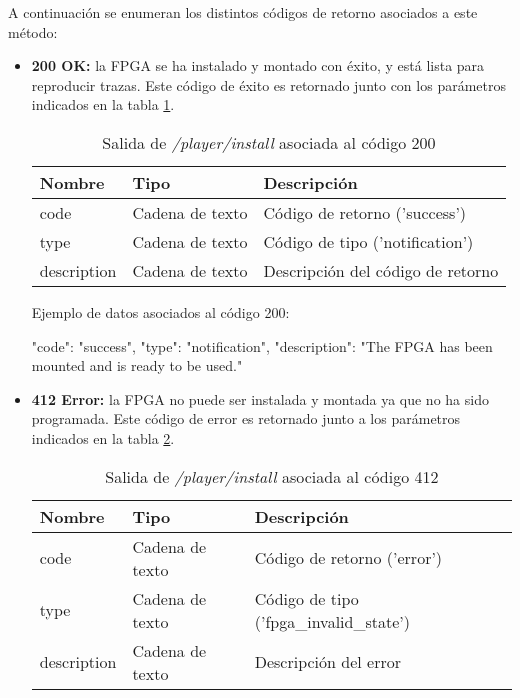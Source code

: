 A continuación se enumeran los distintos códigos de retorno asociados a este método:
\begin{itemize}

\item{\textbf{200 OK:} la \gls{FPGA} se ha instalado y montado con éxito, y está lista para reproducir \glspl{traza}. Este código de éxito es retornado junto con los parámetros indicados en la tabla \ref{extra:api:playerinstall:ok}.
\begin{table}[H]
\centering
\begin{tabular}{|l|l|l|}
\hline
\rowcolor[HTML]{F5F5F5}
\textbf{Nombre}  & \textbf{Tipo}   & \textbf{Descripción}              \\ \hline
code             & Cadena de texto & Código de retorno ('success')     \\ \hline
type             & Cadena de texto & Código de tipo ('notification')   \\ \hline
description      & Cadena de texto & Descripción del código de retorno \\ \hline
\end{tabular}
\caption{Salida de \textit{/player/install} asociada al código 200}
\label{extra:api:playerinstall:ok}
\end{table}
\begin{minipage}{\textwidth}
Ejemplo de datos asociados al código 200:

\begin{code}[language=json]
{
  "code": "success",
  "type": "notification",
  "description": "The FPGA has been mounted and is ready to be used."
}
\end{code}
\end{minipage}
}

\item{\textbf{412 Error:} la \gls{FPGA} no puede ser instalada y montada ya que no ha sido programada. Este código de error es retornado junto a los parámetros indicados en la tabla \ref{extra:api:playerinstall:error}.
\begin{table}[H]
\centering
\begin{tabular}{|l|l|l|}
\hline
\rowcolor[HTML]{F5F5F5}
\textbf{Nombre}  & \textbf{Tipo}   & \textbf{Descripción}                    \\ \hline
code             & Cadena de texto & Código de retorno ('error')             \\ \hline
type             & Cadena de texto & Código de tipo ('fpga\_invalid\_state') \\ \hline
description      & Cadena de texto & Descripción del error                   \\ \hline
\end{tabular}
\caption{Salida de \textit{/player/install} asociada al código 412}
\label{extra:api:playerinstall:error}
\end{table}

}
\end{itemize}
